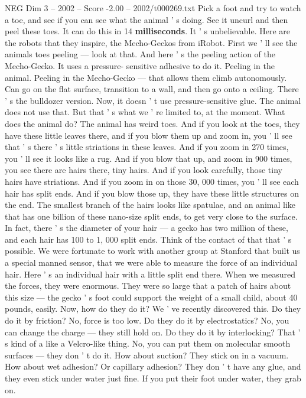\begin{textsample}{NEG Dim 3 – 2002 – Score -2.00 – 2002/t000269.txt}
Pick a foot and try to watch a toe, and see if you can see what the animal ' s doing.
See it uncurl and then peel these toes.
It can do this in 14 \textbf{milliseconds}.
It ' s unbelievable.
Here are the robots that they inspire, the Mecho-Geckos from iRobot.
First we ' ll see the animals toes peeling — look at that.
And here ' s the peeling action of the Mecho-Gecko.
It uses a pressure- sensitive adhesive to do it.
Peeling in the animal.
Peeling in the Mecho-Gecko — that allows them climb autonomously.
Can go on the flat surface, transition to a wall, and then go onto a ceiling.
There ' s the bulldozer version.
Now, it doesn ' t use pressure-sensitive glue.
The animal does not use that.
But that ' s what we ' re limited to, at the moment.
What does the animal do?
The animal has weird toes.
And if you look at the toes, they have these little leaves there, and if you blow them up and zoom in, you ' ll see that ' s there ' s little striations in these leaves.
And if you zoom in 270 times, you ' ll see it looks like a rug.
And if you blow that up, and zoom in 900 times, you see there are hairs there, tiny hairs.
And if you look carefully, those tiny hairs have striations.
And if you zoom in on those 30, 000 times, you ' ll see each hair has split ends.
And if you blow those up, they have these little structures on the end.
The smallest branch of the hairs looks like spatulae, and an animal like that has one billion of these nano-size split ends, to get very close to the surface.
In fact, there ' s the diameter of your hair — a gecko has two million of these, and each hair has 100 to 1, 000 split ends.
Think of the contact of that that ' s possible.
We were fortunate to work with another group at Stanford that built us a special manned sensor, that we were able to measure the force of an individual hair.
Here ' s an individual hair with a little split end there.
When we measured the forces, they were enormous.
They were so large that a patch of hairs about this size — the gecko ' s foot could support the weight of a small child, about 40 pounds, easily.
Now, how do they do it?
We ' ve recently discovered this.
Do they do it by friction?
No, force is too low.
Do they do it by electrostatics?
No, you can change the charge — they still hold on.
Do they do it by interlocking?
That ' s kind of a like a Velcro-like thing.
No, you can put them on molecular smooth surfaces — they don ' t do it.
How about suction?
They stick on in a vacuum.
How about wet adhesion?
Or capillary adhesion?
They don ' t have any glue, and they even stick under water just fine.
If you put their foot under water, they grab on.

\end{textsample}
